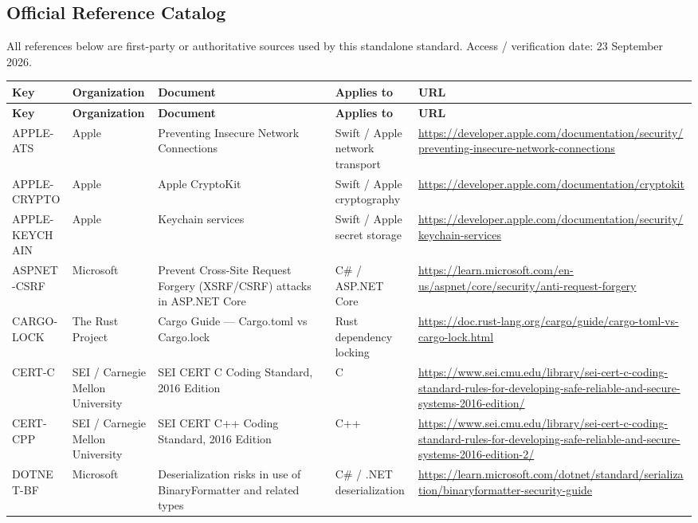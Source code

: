 \documentclass[10pt,letterpaper]{article}
\begin{document}
\begin{landscape}
\section{Official Reference Catalog}
All references below are first-party or authoritative sources used by this standalone standard. Access / verification date: 23 September 2026.

\scriptsize
\setlength{\tabcolsep}{3pt}
\begin{longtable}{@{}P{0.82in}P{1.23in}P{2.25in}P{1.7in}P{3.0in}@{}}
\toprule
\textbf{Key} & \textbf{Organization} & \textbf{Document} & \textbf{Applies to} & \textbf{URL}\\
\midrule
\endfirsthead
\toprule
\textbf{Key} & \textbf{Organization} & \textbf{Document} & \textbf{Applies to} & \textbf{URL}\\
\midrule
\endhead
APPLE-ATS & Apple & Preventing Insecure Network Connections & Swift / Apple network transport & \url{https://developer.apple.com/documentation/security/preventing-insecure-network-connections}\\
APPLE-CRYPTO & Apple & Apple CryptoKit & Swift / Apple cryptography & \url{https://developer.apple.com/documentation/cryptokit}\\
APPLE-KEYCHAIN & Apple & Keychain services & Swift / Apple secret storage & \url{https://developer.apple.com/documentation/security/keychain-services}\\
ASPNET-CSRF & Microsoft & Prevent Cross-Site Request Forgery (XSRF/CSRF) attacks in ASP.NET Core & C\# / ASP.NET Core & \url{https://learn.microsoft.com/en-us/aspnet/core/security/anti-request-forgery}\\
CARGO-LOCK & The Rust Project & Cargo Guide --- Cargo.toml vs Cargo.lock & Rust dependency locking & \url{https://doc.rust-lang.org/cargo/guide/cargo-toml-vs-cargo-lock.html}\\
CERT-C & SEI / Carnegie Mellon University & SEI CERT C Coding Standard, 2016 Edition & C & \url{https://www.sei.cmu.edu/library/sei-cert-c-coding-standard-rules-for-developing-safe-reliable-and-secure-systems-2016-edition/}\\
CERT-CPP & SEI / Carnegie Mellon University & SEI CERT C++ Coding Standard, 2016 Edition & C++ & \url{https://www.sei.cmu.edu/library/sei-cert-c-coding-standard-rules-for-developing-safe-reliable-and-secure-systems-2016-edition-2/}\\
DOTNET-BF & Microsoft & Deserialization risks in use of BinaryFormatter and related types & C\# / .NET deserialization & \url{https://learn.microsoft.com/dotnet/standard/serialization/binaryformatter-security-guide}\\

\end{longtable}
\end{landscape}
\end{document}
